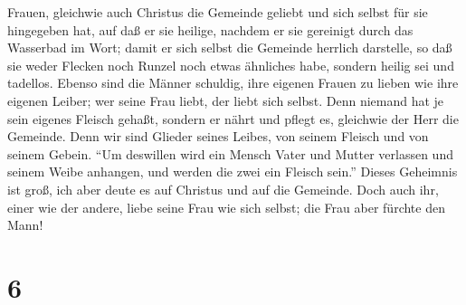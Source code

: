 Frauen, gleichwie auch Christus die Gemeinde geliebt und sich selbst für
sie hingegeben hat,  auf daß er sie heilige, nachdem er
sie gereinigt durch das Wasserbad im Wort;  damit er sich
selbst die Gemeinde herrlich darstelle, so daß sie weder Flecken noch
Runzel noch etwas ähnliches habe, sondern heilig sei und tadellos.
 Ebenso sind die Männer schuldig, ihre eigenen Frauen zu
lieben wie ihre eigenen Leiber; wer seine Frau liebt, der liebt sich
selbst.  Denn niemand hat je sein eigenes Fleisch gehaßt,
sondern er nährt und pflegt es, gleichwie der Herr die Gemeinde.
 Denn wir sind Glieder seines Leibes, von seinem Fleisch
und von seinem Gebein.  ``Um deswillen wird ein Mensch
Vater und Mutter verlassen und seinem Weibe anhangen, und werden die
zwei ein Fleisch sein.''  Dieses Geheimnis ist groß, ich
aber deute es auf Christus und auf die Gemeinde.  Doch
auch ihr, einer wie der andere, liebe seine Frau wie sich selbst; die
Frau aber fürchte den Mann!

\hypertarget{section-5}{%
\section{6}\label{section-5}}

